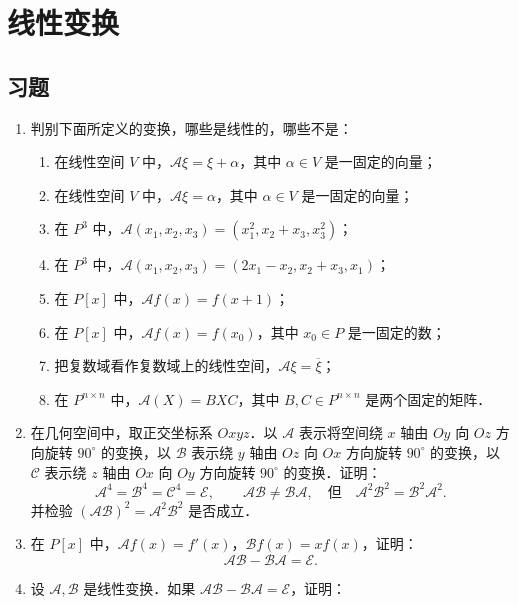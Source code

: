 \chapter{线性变换}

\section{习题}

\begin{enumerate}
  \item 判别下面所定义的变换，哪些是线性的，哪些不是：
  \begin{enumerate}
    \item 在线性空间 $V$ 中，$\mathcal{A}\xi=\xi+\alpha$，其中 $\alpha\in V$ 是一固定的向量；
  \anssub
    \item 在线性空间 $V$ 中，$\mathcal{A}\xi=\alpha$，其中 $\alpha\in V$ 是一固定的向量；
  \anssub
    \item 在 $P^3$ 中，$\mathcal{A}(x_1,x_2,x_3)=(x_1^2,x_2+x_3,x_3^2)$；
  \anssub
    \item 在 $P^3$ 中，$\mathcal{A}(x_1,x_2,x_3)=(2x_1-x_2,x_2+x_3,x_1)$；
  \anssub
    \item 在 $P[x]$ 中，$\mathcal{A}f(x)=f(x+1)$；
  \anssub
    \item 在 $P[x]$ 中，$\mathcal{A}f(x)=f(x_0)$，其中 $x_0\in P$ 是一固定的数；
  \anssub
    \item 把复数域看作复数域上的线性空间，$\mathcal{A}\xi=\overline{\xi}$；
  \anssub
    \item 在 $P^{n\times n}$ 中，$\mathcal{A}(X)=BXC$，其中 $B,C\in P^{n\times n}$ 是两个固定的矩阵．
  \anssub
  \end{enumerate}
  \item 在几何空间中，取正交坐标系 $Oxyz$．以 $\mathcal{A}$ 表示将空间绕 $x$ 轴由 $Oy$ 向 $Oz$ 方向旋转 $90^\circ$ 的变换，以 $\mathcal{B}$ 表示绕 $y$ 轴由 $Oz$ 向 $Ox$ 方向旋转 $90^\circ$ 的变换，以 $\mathcal{C}$ 表示绕 $z$ 轴由 $Ox$ 向 $Oy$ 方向旋转 $90^\circ$ 的变换．证明：
  \[
    \mathcal{A}^4=\mathcal{B}^4=\mathcal{C}^4=\mathcal{E},\qquad
    \mathcal{A}\mathcal{B}\ne\mathcal{B}\mathcal{A},\quad\text{但}\quad
    \mathcal{A}^2\mathcal{B}^2=\mathcal{B}^2\mathcal{A}^2.
  \]
  并检验 $(\mathcal{A}\mathcal{B})^2=\mathcal{A}^2\mathcal{B}^2$ 是否成立．
  \ansproof
  \item 在 $P[x]$ 中，$\mathcal{A}f(x)=f'(x)$，$\mathcal{B}f(x)=xf(x)$，证明：
  \[
    \mathcal{A}\mathcal{B}-\mathcal{B}\mathcal{A}=\mathcal{E}.
  \]
  \ansproof
  \item 设 $\mathcal{A},\mathcal{B}$ 是线性变换．如果 $\mathcal{A}\mathcal{B}-\mathcal{B}\mathcal{A}=\mathcal{E}$，证明：

\end{enumerate}
